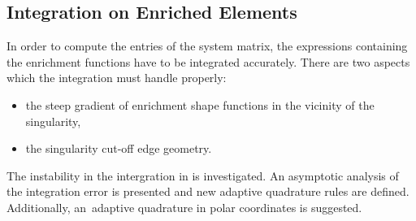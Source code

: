 

\subsection{Integration on Enriched Elements}
\label{sec:integration}
In order to compute the entries of the system matrix, %
the expressions containing the enrichment functions have to be integrated accurately. 
% 
There are two aspects which the integration must handle properly:
\begin{itemize}
  \item the steep gradient of enrichment shape functions in the vicinity of the singularity,
  \item the singularity cut-off edge geometry.
\end{itemize}

The instability in the intergration in \cite{gracie_modelling_2010} is investigated.
An asymptotic analysis of the integration error is presented and new adaptive quadrature rules are defined.
Additionally, an~adaptive quadrature in polar coordinates is suggested.

